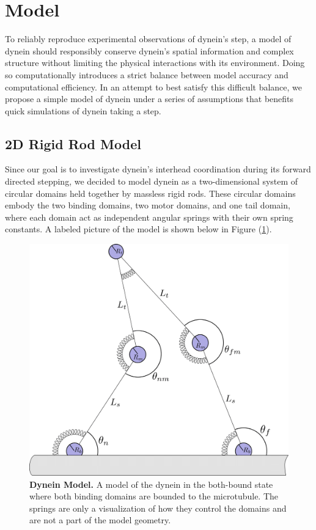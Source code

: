 \section{Model}
To reliably reproduce experimental observations of dynein's step, a model of dynein should responsibly conserve dynein's spatial information and complex structure without limiting the physical interactions with its environment. Doing so computationally introduces a strict balance between model accuracy and computational efficiency. In an attempt to best satisfy this difficult balance, we propose a simple model of dynein under a series of assumptions that benefits quick simulations of dynein taking a step. 


\subsection{2D Rigid Rod Model}
Since our goal is to investigate dynein's interhead coordination during its forward directed stepping, we decided to model dynein as a two-dimensional system of circular domains held together by massless rigid rods. These circular domains embody the two binding domains, two motor domains, and one tail domain, where each domain act as independent angular springs with their own spring constants. A labeled picture of the model is shown below in Figure (\ref{fig:model}). 

\begin{figure}[H]
	\centering
	\includegraphics[width=0.6\columnwidth]{Figures/model-cartoon.png}
	\caption[Dynein Model]{\textbf{Dynein Model.} A model of the dynein in the both-bound state where both binding domains are bounded to the microtubule. The springs are only a visualization of how they control the domains and are not a part of the model geometry. \cite{Capek2017}}
	\label{fig:model}
\end{figure}

